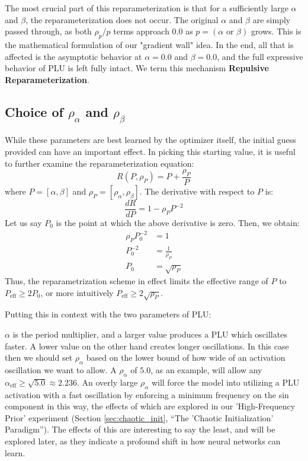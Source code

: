 \documentclass[11pt, letterpaper]{article}
\begin{document}
The most crucial part of this reparameterization is that for a sufficiently large $\alpha$ and $\beta$, the reparameterization does not occur. The original $\alpha$ and $\beta$ are simply passed through, as both $\rho_p / p$ terms approach $0.0$ as $p=(\alpha \text{ or } \beta)$ grows. This is the mathematical formulation of our "gradient wall" idea. In the end, all that is affected is the asymptotic behavior at $\alpha=0.0$ and $\beta=0.0$, and the full expressive behavior of PLU is left fully intact. We term this mechanism \textbf{Repulsive Reparameterization}.

\subsection{Choice of \texorpdfstring{$\rho_\alpha$ and $\rho_\beta$}{rho\_alpha and rho\_beta}}

While these parameters are best learned by the optimizer itself, the initial guess provided can have an important effect. In picking this starting value, it is useful to further examine the reparameterization equation:
\begin{equation}
    R(P, \rho_P) = P + \frac{\rho_P}{P}
    \label{eq:reparam}
\end{equation}
where $P = [\alpha, \beta]$ and $\rho_P = [\rho_\alpha, \rho_\beta]$.
The derivative with respect to $P$ is:
\begin{equation}
    \frac{dR}{dP} = 1 - \rho_P P^{-2}
\end{equation}
Let us say $P_0$ is the point at which the above derivative is zero. Then, we obtain:
\begin{align*}
    \rho_P P_0^{-2} &= 1 \\
    P_0^{-2} &= \frac{1}{\rho_P} \\
    P_0 &= \sqrt{\rho_P}
\end{align*}
Thus, the reparametrization scheme in effect limits the effective range of $P$ to $P_{\text{eff}} \ge 2 P_0$, or more intuitively $P_{\text{eff}} \ge 2 \sqrt{\rho_P}$.

Putting this in context with the two parameters of PLU:

$\alpha$ is the period multiplier, and a larger value produces a PLU which oscillates faster. A lower value on the other hand creates longer oscillations. In this case then we should set $\rho_\alpha$ based on the lower bound of how wide of an activation oscillation we want to allow. A $\rho_\alpha$ of $5.0$, as an example, will allow any $\alpha_{\text{eff}} \ge \sqrt{5.0} \approx 2.236$. An overly large $\rho_\alpha$ will force the model into utilizing a PLU activation with a fast oscillation by enforcing a minimum frequency on the sin component in this way, the effects of which are explored in our 'High-Frequency Prior' experiment (Section \ref{sec:chaotic_init}, ``The 'Chaotic Initialization' Paradigm''). The effects of this are interesting to say the least, and will be explored later, as they indicate a profound shift in how neural networks can learn.
\end{document}
